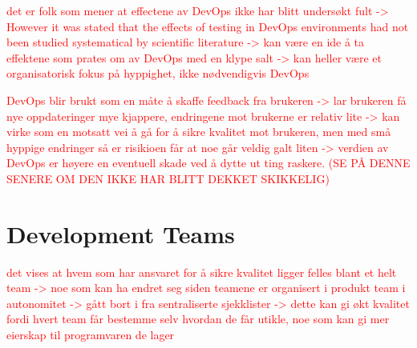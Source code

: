 


\textcolor{red}{det er folk som mener at effectene av DevOps ikke har blitt undersøkt fult -> However it was stated that the effects of testing in DevOps environments had not been studied systematical by scientific literature \cite{dsc_2019}\cite{ja_2016} -> kan være en ide å ta effektene som prates om av DevOps med en klype salt -> kan heller være et organisatorisk fokus på hyppighet, ikke nødvendigvis DevOps}

\textcolor{red}{DevOps blir brukt som en måte å skaffe feedback fra brukeren -> lar brukeren få nye oppdateringer mye kjappere, endringene mot brukerne er relativ lite -> kan virke som en motsatt vei å gå for å sikre kvalitet mot brukeren, men med små hyppige endringer så er risikioen får at noe går veldig galt liten -> verdien av DevOps er høyere en eventuell skade ved å dytte ut ting raskere. (SE PÅ DENNE SENERE OM DEN IKKE HAR BLITT DEKKET SKIKKELIG)}

\section{Development Teams}
\textcolor{red}{det vises at hvem som har ansvaret for å sikre kvalitet ligger felles blant et helt team -> noe som kan ha endret seg siden teamene er organisert i produkt team i autonomitet -> gått bort i fra sentraliserte sjekklister -> dette kan gi økt kvalitet fordi hvert team får bestemme selv hvordan de får utikle, noe som kan gi mer eierskap til programvaren de lager}

